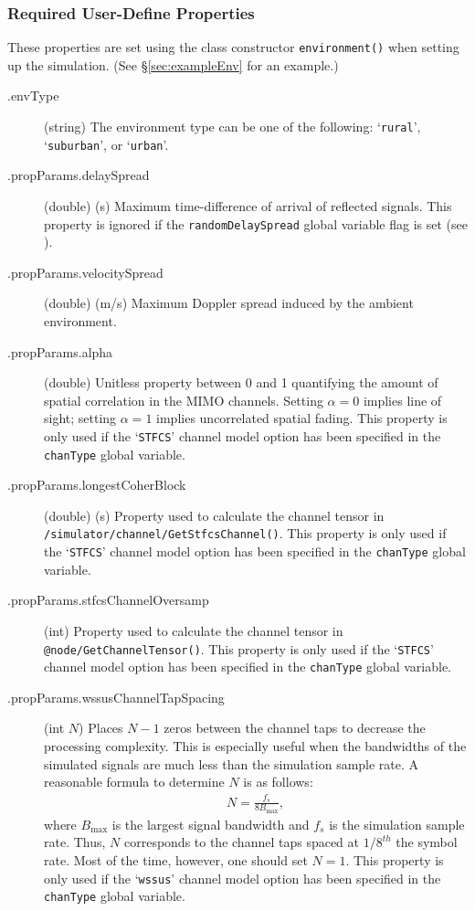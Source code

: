 \subsubsection{Required User-Define Properties}

These properties are set using the class constructor
\verb+environment()+ when setting up the simulation.  (See
\S\ref{sec:exampleEnv} for an example.)

\begin{description}
\item[.envType] (string) The environment type can be one of the following:
`\verb+rural+', `\verb+suburban+', or `\verb+urban+'.

\item[.propParams.delaySpread] (double) (s) Maximum time-difference of arrival of
reflected signals. This property is ignored if the \verb+randomDelaySpread+ global variable flag is set (see ).

\item[.propParams.velocitySpread] (double) (m/s) Maximum Doppler spread induced by the ambient environment.

\item[.propParams.alpha] (double) Unitless property between 0 and 1 quantifying the
amount of spatial correlation in the MIMO channels.  Setting $\alpha = 0$
implies line of sight; setting $\alpha = 1$ implies uncorrelated spatial
fading.  This property is only used if the `\verb+STFCS+' channel model option has been specified in the \verb+chanType+ global variable.

\item[.propParams.longestCoherBlock] (double) (s) Property used to calculate the channel tensor in \verb+/simulator/channel/GetStfcsChannel()+.  This property is only used if the `\verb+STFCS+' channel model option has been specified in the \verb+chanType+ global variable.

\item[.propParams.stfcsChannelOversamp] (int) Property used to calculate the channel tensor in \verb+@node/GetChannelTensor()+.  This property is only used if the `\verb+STFCS+' channel model option has been specified in the \verb+chanType+ global variable.

\item[.propParams.wssusChannelTapSpacing] (int $N$) Places $N-1$ zeros between the channel taps to decrease the processing complexity.  This is especially useful when the bandwidths of the simulated signals are much less than the simulation sample rate.  A reasonable formula to determine $N$ is as follows:
%
\begin{eqnarray}
    N = \frac{f_s}{8B_{\max}},
\end{eqnarray}
%
where $B_{\max}$ is the largest signal bandwidth and $f_s$ is the simulation sample rate.  Thus, $N$ corresponds to the channel taps spaced at $1/8^{th}$ the symbol rate.  Most of the time, however, one should set $N=1$. This property is only used if the `\verb+wssus+' channel model option has been specified in the \verb+chanType+ global variable.


\end{description}
